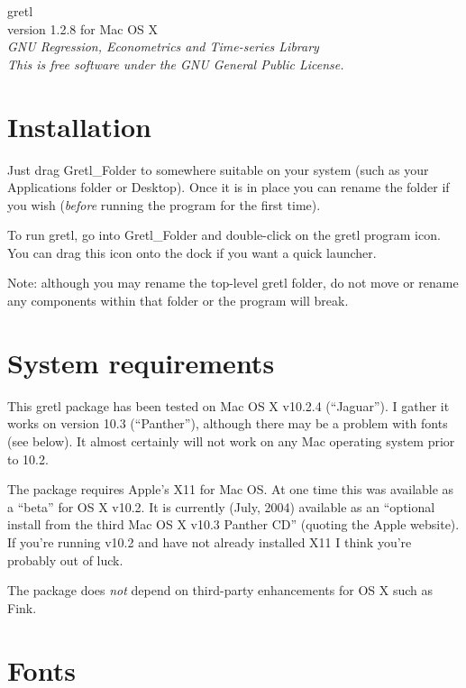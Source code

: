 \documentclass[11pt]{article}
\begin{document}
\begin{center}
{\color{gold} \titlefont gretl} \\[1ex]
version 1.2.8 for Mac OS X \\[2ex]

\textit{GNU Regression, Econometrics and Time-series Library\\
  This is free software under the GNU General Public License.}

\end{center}

\section{Installation}
\label{sec:install}

Just drag \textsf{Gretl\_Folder} to somewhere suitable on your system
(such as your Applications folder or Desktop).  Once it is in place
you can rename the folder if you wish (\textit{before} running the
program for the first time).

To run gretl, go into \textsf{Gretl\_Folder} and double-click on the
gretl program icon.  You can drag this icon onto the dock if you want
a quick launcher.  

Note: although you may rename the top-level gretl folder, do not move
or rename any components within that folder or the program will break.

\section{System requirements}
\label{sec:os}

This gretl package has been tested on Mac OS X v10.2.4 (``Jaguar'').
I gather it works on version 10.3 (``Panther''), although there may be
a problem with fonts (see below).  It almost certainly will
not work on any Mac operating system prior to 10.2.

The package requires Apple's X11 for Mac OS.  At one time this was
available as a ``beta'' for OS X v10.2.  It is currently (July, 2004)
available as an ``optional install from the third Mac OS X v10.3
Panther CD'' (quoting the Apple website).  If you're running v10.2 and
have not already installed X11 I think you're probably out of luck.

The package does \textit{not} depend on third-party enhancements for
OS X such as \textsf{Fink}.

\section{Fonts}
\label{sec:fonts}
\end{document}
